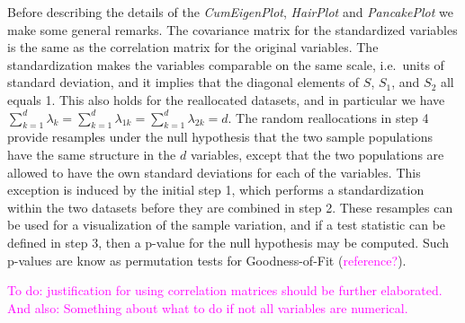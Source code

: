 \documentclass[titlepage,11pt,twoside]{article}
\newcommand{\hl}[1]{\textcolor{magenta}{#1}}
\newcommand{\RR}{\mathbb{R}}
\begin{document}
Before describing the details of the  \emph{CumEigenPlot}, \emph{HairPlot} and \emph{PancakePlot} we make some general remarks. The covariance matrix for the standardized variables is the same as the correlation matrix for the original variables. The standardization makes the variables comparable on the same scale, i.e.\ units of standard deviation, and it implies that the diagonal elements of $S$, $S_1$, and $S_2$ all equals 1. This also holds for the reallocated datasets, and in particular we have $\sum_{k=1}^d \lambda_k = \sum_{k=1}^d \lambda_{1k} = \sum_{k=1}^d \lambda_{2k} =  d$. The random reallocations in step 4 provide resamples under the null hypothesis that the two sample populations have the same structure in the $d$ variables, except that the two populations are allowed to have the own standard deviations for each of the variables. This exception is induced by the initial step 1, which performs a standardization within the two datasets before they are combined in step 2. These resamples can be used for a visualization of the sample variation, and if a test statistic can be defined in step 3, then a p-value for the null hypothesis may be computed. Such p-values are know as permutation tests for Goodness-of-Fit (\hl{reference?}).


\hl{To do: justification for using correlation matrices should be further elaborated. And also: Something about what to do if not all variables are numerical. 
}

\medskip
\end{document}
